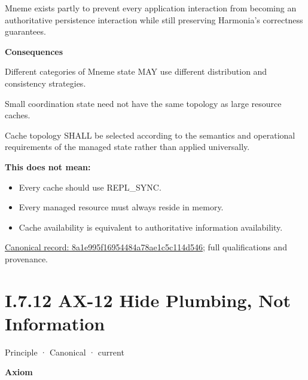 Mneme exists partly to prevent every application interaction from
becoming an authoritative persistence interaction while still preserving
Harmonia's correctness guarantees.



\par\medskip\textbf{Consequences}\par


Different categories of Mneme state MAY use different distribution and
consistency strategies.



Small coordination state need not have the same topology as large
resource caches.



Cache topology SHALL be selected according to the semantics and
operational requirements of the managed state rather than applied
universally.



\textbf{This does not mean:}



\begin{itemize}


\item Every cache should use REPL\_SYNC.

\item Every managed resource must always reside in memory.

\item Cache availability is equivalent to authoritative information availability.

\end{itemize}

{\footnotesize \href{../../../../continuum/motivation/principle/8a1e995f16954484a78ae1c5c114d546.md}{Canonical record: 8a1e995f16954484a78ae1c5c114d546}; full qualifications and provenance.}\par
\section*{I.7.12 AX-12 Hide Plumbing, Not Information}
\label{navigation:I.7.12}

\label{element:ce85889bd9b34f79a53d4c907ceb19d4}
{\small Principle · Canonical · current}\par

\par\medskip\textbf{Axiom}\par


